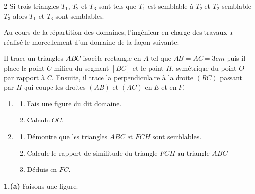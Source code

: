 \begin{multicols*}{2}
{  		Si trois triangles $T_{1}$, $T_{2}$ et $T_{3}$ sont tels que $T_{1}$ est semblable à $T_{2}$ et $T_{2}$ semblable $T_{3}$ alors $T_{1}$ et $T_{3}$ sont semblables.
  	}
  	
  	\hspace{0.4cm}Au cours de la répartition des domaines, l'ingénieur en charge des travaux a réalisé le morcellement d'un domaine de la façon suivante:
  	
  	Il trace un triangles $ABC$ isocèle rectangle en $A$ tel que $AB=AC=3 cm$ puis il place le point $O$ milieu du segment $[BC]$ et le point $H$, symétrique du point $O$ par rapport à $C$. Ensuite, il trace la perpendiculaire à la droite $(BC)$ passant par $H$  qui coupe les droites $(AB)$ et  $(AC)$ en $E$ et en $F$.
  	\begin{enumerate} 	
  		\item 
  		\begin{enumerate}
  			\item  Fais une figure du dit domaine.
  			\item Calcule $OC$.
  		\end{enumerate}
  		\item 
  		\begin{enumerate}
  			\item  Démontre que les triangles $ABC$ et $FCH$ sont semblables.
  			\item  Calcule le rapport de similitude du triangle $FCH$ au triangle $ABC$
  			\item  Déduis-en $FC$. 
  		\end{enumerate}
  	\end{enumerate}
  	\dure
  	\resul
  	\textbf{1.(a)} Faisons une figure.
  	

\end{multicols*}
